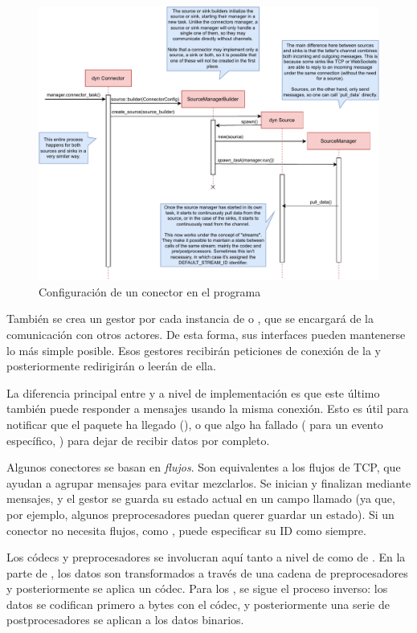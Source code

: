 \begin{figure}
    \centering
    \includegraphics[width=\textwidth]{./Imagenes/setting-up.pdf}
    \caption{Configuración de un conector en el programa}%
    \label{fig:tremor_setting_up}
\end{figure}

También se crea un gestor por cada instancia de \sink o \source, que se
encargará de la comunicación con otros actores. De esta forma, sus interfaces
pueden mantenerse lo más simple posible. Esos gestores recibirán peticiones de
conexión de la \pipeline y posteriormente redirigirán o leerán de ella.

La diferencia principal entre \sources y \sinks a nivel de implementación es que
este último también puede responder a mensajes usando la misma conexión. Esto es
útil para notificar que el paquete ha llegado (), o que algo ha
fallado ( para un evento específico, ) para
dejar de recibir datos por completo.

Algunos conectores se basan en \emph{flujos}. Son equivalentes a los flujos de
TCP, que ayudan a agrupar mensajes para evitar mezclarlos. Se inician y
finalizan mediante mensajes, y el gestor se guarda su estado actual en un campo
llamado  (ya que, por ejemplo, algunos preprocesadores puedan
querer guardar un estado). Si un conector no necesita flujos, como
, puede especificar su ID como  siempre.

Los códecs y preprocesadores se involucran aquí tanto a nivel de \source como de
\sink. En la parte de \source, los datos son transformados a través de una
cadena de preprocesadores y posteriormente se aplica un códec. Para los \sinks,
se sigue el proceso inverso: los datos se codifican primero a bytes con el
códec, y posteriormente una serie de postprocesadores se aplican a los datos
binarios.

